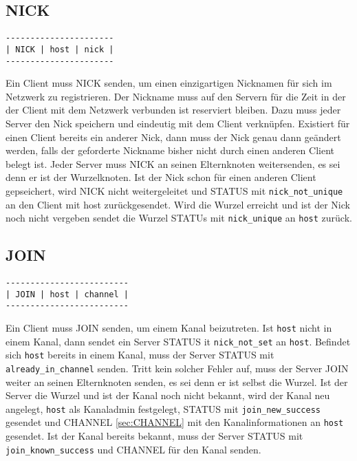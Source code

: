 \documentclass{article}
\begin{document}
\subsection{NICK}

\begin{lstlisting}
----------------------
| NICK | host | nick |
----------------------
\end{lstlisting}

Ein Client muss NICK senden, um einen einzigartigen Nicknamen für sich im Netzwerk zu registrieren.
Der Nickname muss auf den Servern für die Zeit in der der Client mit dem Netzwerk verbunden ist reserviert bleiben.
Dazu muss jeder Server den Nick speichern und eindeutig mit dem Client verknüpfen.
Existiert für einen Client bereits ein anderer Nick, dann muss der Nick genau dann geändert werden, falls der geforderte Nickname bisher nicht durch einen anderen Client belegt ist. 
Jeder Server muss NICK an seinen Elternknoten weitersenden, es sei denn er ist der Wurzelknoten.
Ist der Nick schon für einen anderen Client gepseichert, wird NICK nicht weitergeleitet und STATUS mit \lstinline{nick_not_unique} an den Client mit host zurückgesendet. 
Wird die Wurzel erreicht und ist der Nick noch nicht vergeben sendet die Wurzel STATUs mit \lstinline{nick_unique} an \lstinline{host} zurück.

\subsection{JOIN}

\begin{lstlisting}
-------------------------
| JOIN | host | channel |
-------------------------
\end{lstlisting}

Ein Client muss JOIN senden, um einem Kanal beizutreten.
Ist \lstinline{host} nicht in einem Kanal, dann sendet ein Server STATUS it \lstinline{nick_not_set} an \lstinline{host}.
Befindet sich \lstinline{host} bereits in einem Kanal, muss der Server STATUS mit \lstinline{already_in_channel} senden.
Tritt kein solcher Fehler auf, muss der Server JOIN weiter an seinen Elternknoten senden, es sei denn er ist selbst die Wurzel.
Ist der Server die Wurzel und ist der Kanal noch nicht bekannt, wird der Kanal neu angelegt, \lstinline{host} als Kanaladmin festgelegt, STATUS mit \lstinline{join_new_success} gesendet und CHANNEL \ref{sec:CHANNEL} mit den Kanalinformationen an \lstinline{host} gesendet.
Ist der Kanal bereits bekannt, muss der Server STATUS mit \lstinline{join_known_success} und CHANNEL für den Kanal senden.
\end{document}
